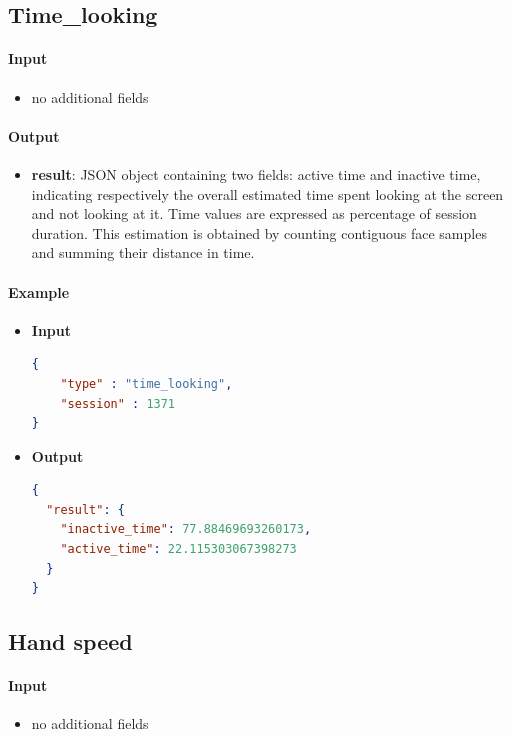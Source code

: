 \documentclass[a4paper,notitlepage,onecolumn]{hitec}  %
\begin{document}
\subsection{Time\_looking}

\paragraph{Input}
\begin{itemize}
\item no additional fields
\end{itemize}

\paragraph{Output}
\begin{itemize}
\item\textbf{result}: JSON object containing two fields: active time and inactive time, indicating respectively the overall estimated time spent looking at the screen and not looking at it. Time values are expressed as percentage of session duration. This estimation is obtained by counting contiguous face samples and summing their distance in time.
\end{itemize}

\paragraph{Example}
\begin{itemize}
\item\textbf{Input}
\begin{lstlisting}[language=json,firstnumber=1]
{
    "type" : "time_looking",
    "session" : 1371
}
\end{lstlisting}
\item\textbf{Output}
\begin{lstlisting}[language=json,firstnumber=1]
{
  "result": {
    "inactive_time": 77.88469693260173,
    "active_time": 22.115303067398273
  }
}
\end{lstlisting}
\end{itemize}

\subsection{Hand speed}

\paragraph{Input}
\begin{itemize}
\item no additional fields
\end{itemize}
\end{document}

